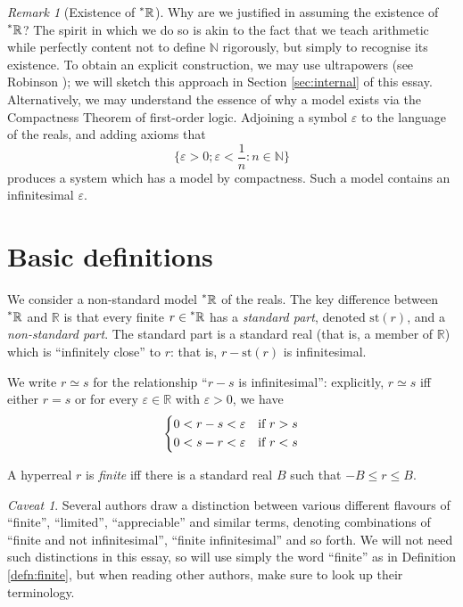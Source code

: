 \documentclass[11pt]{amsart}
\theoremstyle{remark}
\newtheorem*{remark}{Remark}
\newtheorem*{caveat}{Caveat}
\newcommand{\st}{\mathrm{st}}
\newcommand{\hyp}[1][\mathbb{R}]{\prescript{*}{}{#1}}
\newcommand{\near}{\simeq}
\begin{document}
\begin{remark}[Existence of $\hyp$]
Why are we justified in assuming the existence of $\hyp$?
The spirit in which we do so is akin to the fact that we teach arithmetic while perfectly content not to define $\mathbb{N}$ rigorously, but simply to recognise its existence.
To obtain an explicit construction, we may use ultrapowers (see Robinson \cite{robinson}); we will sketch this approach in Section \ref{sec:internal} of this essay.
Alternatively, we may understand the essence of why a model exists via the Compactness Theorem of first-order logic.
Adjoining a symbol $\varepsilon$ to the language of the reals, and adding axioms that $$\{ \varepsilon > 0 ; \varepsilon < \frac{1}{n} : n \in \mathbb{N} \}$$
produces a system which has a model by compactness.
Such a model contains an infinitesimal $\varepsilon$.
\end{remark}

\section{Basic definitions}

We consider a non-standard model $\hyp$ of the reals.
The key difference between $\hyp$ and $\mathbb{R}$ is that every finite $r \in \hyp$ has a \emph{standard part}, denoted $\st(r)$, and a \emph{non-standard part}.
The standard part is a standard real (that is, a member of $\mathbb{R}$) which is ``infinitely close'' to $r$: that is, $r - \st(r)$ is infinitesimal.

We write $r \near s$ for the relationship ``$r-s$ is infinitesimal'': explicitly, $r \near s$ iff either $r = s$ or for every $\varepsilon \in \mathbb{R}$ with $\varepsilon > 0$, we have 
$$\begin{dcases}
0 < r-s < \varepsilon & \text{if $r > s$} \\
0 < s-r < \varepsilon & \text{if $r < s$}
\end{dcases}
$$

\begin{defn} \label{defn:finite}
A hyperreal $r$ is \emph{finite} iff there is a standard real $B$ such that $-B \leq r \leq B$.
\end{defn}

\begin{caveat} Several authors draw a distinction between various different flavours of ``finite'', ``limited'', ``appreciable'' and similar terms, denoting combinations of ``finite and not infinitesimal'', ``finite infinitesimal'' and so forth.
We will not need such distinctions in this essay, so will use simply the word ``finite'' as in Definition \ref{defn:finite}, but when reading other authors, make sure to look up their terminology.
\end{caveat}
\end{document}
